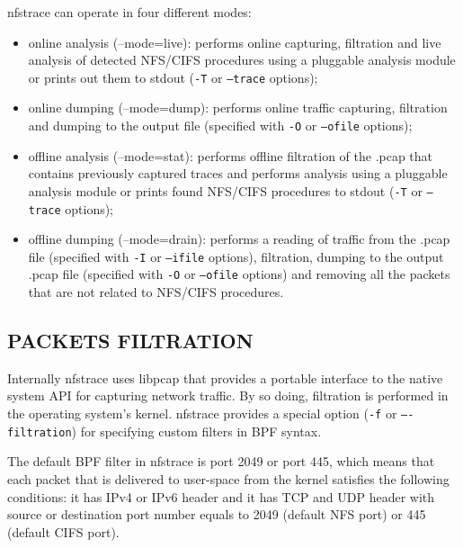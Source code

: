 \documentclass[oneside]{article}
\newcommand{\code}[1]{\texttt{#1}}
\newcommand{\gls}{}
\newcommand*{\textfile}[1]{\textsf{#1}}
\newcommand*{\textprog}[1]{\textfile{#1}}
\begin{document}
\begin{minipage}[t]{\linewidth}
\textprog{nfstrace} can operate in four different modes:
\vspace{5mm}
\begin{itemize}
\item online analysis (\textprog{--mode=live}): performs online capturing,
    filtration and live analysis of detected NFS/CIFS procedures using a
    pluggable analysis module or prints out them to stdout (\code{-T} or
    \code{--trace} options); \item online dumping (\textprog{--mode=dump}):
    performs online traffic capturing, filtration and dumping to the output
    file (specified with \code{-O} or \code{--ofile} options); 
\item offline analysis (\textprog{--mode=stat}):
    performs offline filtration of the .pcap that contains previously captured
    traces and performs analysis using a pluggable analysis module or prints
    found NFS/CIFS procedures to stdout (\code{-T} or \code{–trace} options); 
\item offline dumping (\textprog{--mode=drain}): performs a reading of traffic
    from the .pcap file (specified with \code{-I} or \code{--ifile} options),
    filtration, dumping to the output .pcap file (specified with \code{-O} or
    \code{--ofile} options) and removing all the packets that are not related
    to NFS/CIFS procedures.  \end{itemize}
\end{minipage}

\subsection{PACKETS FILTRATION}

Internally \textprog{nfstrace} uses libpcap that provides a portable interface to
the native system API for capturing network traffic. By so doing, filtration is
performed in the operating system's kernel. \textprog{nfstrace} provides a special option
(\code{-f} or \code{–-filtration}) for specifying custom filters in \gls{BPF} syntax.

The default \gls{BPF} filter in \textprog{nfstrace} is \textprog{port 2049 or port
445}, which means that each packet that is delivered to user-space from the
kernel satisfies the following conditions: it has IPv4 or IPv6 header and it
has TCP and UDP header with source or destination port number equals to 2049
(default NFS port) or 445 (default \gls{CIFS} port).
\end{document}

